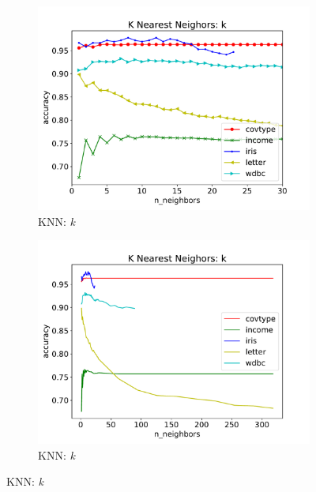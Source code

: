 \documentclass[twoside,11pt]{article}
\begin{document}
			\begin{figure}[h]
				\centering
				
				\begin{subfigure}[b]{.49\linewidth}
					\includegraphics[width=\linewidth]{knn_hyperparam_zoomed}
					\caption{KNN: \textit{k}}
					\label{fig:hyperparam_knn_zoomed}
				\end{subfigure}
				\begin{subfigure}[b]{.49\linewidth}
					\includegraphics[width=\linewidth]{knn_hyperparam_all}
					\caption{KNN: \textit{k}}
					\label{fig:hyperparam_knn_all}
				\end{subfigure}
			

\end{figure}
\end{document}
